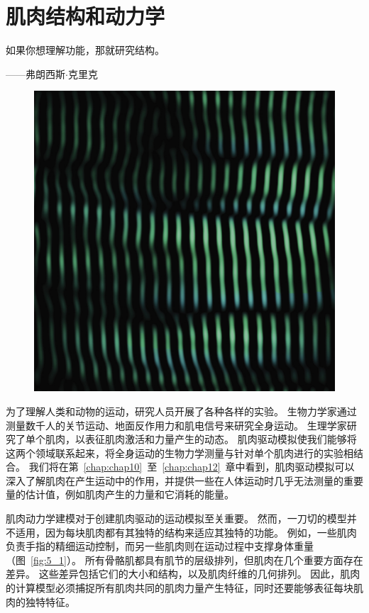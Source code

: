\chapter{肌肉结构和动力学} \label{chap:chap5}


如果你想理解功能，那就研究结构。

\begin{flushright}
	——弗朗西斯$\cdot$克里克
\end{flushright}


\begin{figure}[!htb]
	\centering
	\includegraphics[width=1.0\linewidth]{chap4/4_0}
	\caption*{ \label{fig:5_0}}
\end{figure}


为了理解人类和动物的运动，研究人员开展了各种各样的实验。
生物力学家通过测量数千人的关节运动、地面反作用力和肌电信号来研究全身运动。
生理学家研究了单个肌肉，以表征肌肉激活和力量产生的动态。
肌肉驱动模拟使我们能够将这两个领域联系起来，将全身运动的生物力学测量与针对单个肌肉进行的实验相结合。
我们将在第~\ref{chap:chap10}~至~\ref{chap:chap12}~章中看到，肌肉驱动模拟可以深入了解肌肉在产生运动中的作用，并提供一些在人体运动时几乎无法测量的重要量的估计值，例如肌肉产生的力量和它消耗的能量。


肌肉动力学建模对于创建肌肉驱动的运动模拟至关重要。
然而，一刀切的模型并不适用，因为每块肌肉都有其独特的结构来适应其独特的功能。
例如，一些肌肉负责手指的精细运动控制，而另一些肌肉则在运动过程中支撑身体重量（图~\ref{fig:5_1}）。
所有骨骼肌都具有肌节的层级排列，但肌肉在几个重要方面存在差异。
这些差异包括它们的大小和结构，以及肌肉纤维的几何排列。
因此，肌肉的计算模型必须捕捉所有肌肉共同的肌肉力量产生特征，同时还要能够表征每块肌肉的独特特征。


